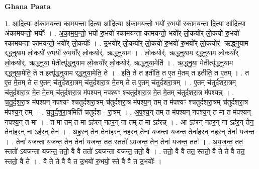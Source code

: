 \documentclass[17pt]{extarticle}
\begin{document}
\textbf{Ghana Paata } \newline

1. आ॒दि॒त्या अ॑कामयन्ता कामयन्ता दि॒त्या आ॑दि॒त्या अ॑कामयन्तो॒ भयो॑ रु॒भयो॑ रकामयन्ता दि॒त्या आ॑दि॒त्या अ॑कामयन्तो॒ भयोः᳚ । . अ॒का॒म॒य॒न्तो॒ भयो॑ रु॒भयो॑ रकामयन्ता कामयन्तो॒ भयो᳚र् लो॒कयो᳚र् लो॒कयो॑ रु॒भयो॑ रकामयन्ता 
कामयन्तो॒ भयो᳚र् लो॒कयोः᳚ । . उ॒भयो᳚र् लो॒कयो᳚र् लो॒कयो॑ रु॒भयो॑ रु॒भयो᳚र् लो॒कयोर्॑. ऋद्ध्नुयाम र्‌द्ध्नुयाम लो॒कयो॑ रु॒भयो॑ रु॒भयो᳚र् लो॒कयोर्॑. ऋद्ध्नुयाम । . लो॒कयोर्॑. ऋद्ध्नुयाम र्‌द्ध्नुयाम लो॒कयो᳚र् लो॒कयोर्॑. ऋद्ध्नुया॒ मेतीत्यृ॑द्ध्नुयाम लो॒कयो᳚र् लो॒कयोर्॑. ऋद्ध्नुया॒मेति॑ । . ऋ॒द्ध्नु॒या॒ मेतीत्यृ॑द्ध्नुयाम र्‌द्ध्नुया॒मेति॒ ते त इत्यृ॑द्ध्नुयाम र्‌द्ध्नुया॒मेति॒ ते । . इति॒ ते त इतीति॒ त ए॒त मे॒तम् त इतीति॒ त ए॒तम् । . त ए॒त मे॒तम् ते त ए॒तम् च॑तुर्दशरा॒त्रम् च॑तुर्दशरा॒त्र मे॒तम् ते त ए॒तम् च॑तुर्दशरा॒त्रम् । . ए॒तम् च॑तुर्दशरा॒त्रम् च॑तुर्दशरा॒त्र मे॒त मे॒तम् च॑तुर्दशरा॒त्र म॑पश्यन् नपश्यꣳ श्चतुर्दशरा॒त्र मे॒त मे॒तम् च॑तुर्दशरा॒त्र म॑पश्यन्न् । . च॒तु॒र्द॒श॒रा॒त्र म॑पश्यन् नपश्यꣳ श्चतुर्दशरा॒त्रम् च॑तुर्दशरा॒त्र म॑पश्य॒न् तम् त म॑पश्यꣳ श्चतुर्दशरा॒त्रम् च॑तुर्दशरा॒त्र म॑पश्य॒न् तम् । . च॒तु॒र्द॒श॒रा॒त्रमिति॑ चतुर्दश - रा॒त्रम् । . अ॒प॒श्य॒न् तम् त म॑पश्यन् नपश्य॒न् त मा त म॑पश्यन् नपश्य॒न् त मा । . त मा तम् त मा ऽह॑रन् नहर॒न् ना तम् त मा ऽह॑रन्न् । . आ ऽह॑रन् नहर॒न् ना ऽह॑र॒न् तेन॒ तेना॑हर॒न् ना ऽह॑र॒न् तेन॑ । . अ॒ह॒र॒न् तेन॒ तेना॑हरन् नहर॒न् तेना॑ यजन्ता यजन्त॒ तेना॑हरन् नहर॒न् तेना॑ यजन्त । . तेना॑ यजन्ता यजन्त॒ तेन॒ तेना॑ यजन्त॒ तत॒ स्ततो॑ ऽयजन्त॒ तेन॒ तेना॑ यजन्त॒ ततः॑ । . अ॒य॒ज॒न्त॒ तत॒ स्ततो॑ ऽयजन्ता यजन्त॒ ततो॒ वै वै ततो॑ ऽयजन्ता यजन्त॒ ततो॒ वै । . ततो॒ वै वै तत॒ स्ततो॒ वै ते ते वै तत॒ स्ततो॒ वै ते । . वै ते ते वै वै त उ॒भयो॑ रु॒भयो॒ स्ते वै वै त उ॒भयोः᳚ । \newline
\end{document}
